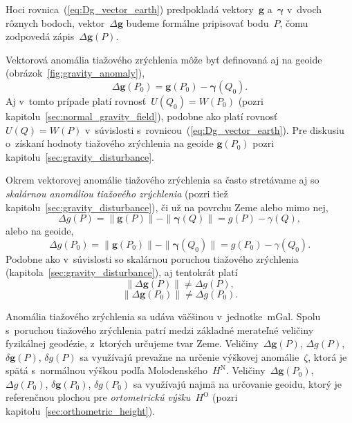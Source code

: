 \documentclass[a4paper, 12pt]{book}
\let\vec\mathbf
\begin{document}
Hoci rovnica~(\ref{eq:Dg_vector_earth}) predpokladá vektory~$\vec g$ 
a~$\boldsymbol\gamma$ v~dvoch rôznych bodoch, vektor~$\Delta \vec g$ budeme 
formálne pripisovať bodu~$P$, čomu zodpovedá zápis~$\Delta \vec g(P)$.

Vektorová anomália tiažového zrýchlenia môže byť definovaná aj na geoide 
(obrázok~\ref{fig:gravity_anomaly}),
%
\begin{equation}
\label{eq:Dg_vector_geoid}
\Delta \vec g(P_0) = \vec g(P_0) - \boldsymbol\gamma(Q_0){.}
\end{equation}
%
Aj v~tomto prípade platí rovnosť~$U(Q_0) = W(P_0)$ (pozri 
kapitolu~\ref{sec:normal_gravity_field}), podobne ako platí rovnosť $U(Q) 
= W(P)$ v~súvislosti s~rovnicou~(\ref{eq:Dg_vector_earth}).  Pre diskusiu 
o~získaní hodnoty tiažového zrýchlenia na geoide $\vec g(P_0)$ pozri 
kapitolu~\ref{sec:gravity_disturbance}.

Okrem vektorovej anomálie tiažového zrýchlenia sa často stretávame aj so 
\emph{skalárnou anomáliou tiažového zrýchlenia} (pozri tiež 
kapitolu~\ref{sec:gravity_disturbance}), či už na povrchu Zeme alebo mimo nej,
%
\begin{equation}
\label{eq:Dg_scalar_earth}
\Delta g(P) = \| \vec g(P) \| - \| \boldsymbol \gamma(Q) \| = g(P) 
- \gamma(Q){,}
\end{equation}
%
alebo na geoide,
%
\begin{equation}
\label{eq:Dg_scalar_geoid}
\Delta g(P_0) = \| \vec g(P_0) \| - \| \boldsymbol \gamma(Q_0) \| = g(P_0) 
- \gamma(Q_0){.}
\end{equation}
%
Podobne ako v~súvislosti so skalárnou poruchou tiažového zrýchlenia 
(kapitola~\ref{sec:gravity_disturbance}), aj tentokrát platí
%
\begin{equation}
\| \Delta \vec g(P) \| \neq \Delta g(P){,}
\end{equation}
%
\begin{equation}
\| \Delta \vec g(P_0) \| \neq \Delta g(P_0){.}
\end{equation}

Anomália tiažového zrýchlenia sa udáva väčšinou v~jednotke~mGal.  Spolu 
s~poruchou tiažového zrýchlenia patrí medzi základné merateľné veličiny 
fyzikálnej geodézie, z~ktorých určujeme tvar Zeme.  Veličiny~$\Delta \vec 
g(P)$, $\Delta g(P)$, $\delta \vec g(P)$, $\delta g(P)$ sa využívajú prevažne 
na určenie výškovej anomálie~$\zeta$, ktorá je spätá s~normálnou výškou podľa 
Molodenského~$H^\mathrm{N}$.  Veličiny~$\Delta \vec g(P_0)$, $\Delta g(P_0)$, 
$\delta \vec g(P_0)$, $\delta g(P_0)$ sa využívajú najmä na určovanie geoidu, 
ktorý je referenčnou plochou pre \emph{ortometrickú výšku}~$H^\mathrm{O}$ 
(pozri kapitolu~\ref{sec:orthometric_height}).
\end{document}
